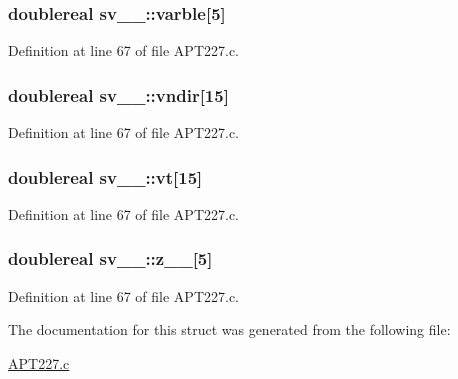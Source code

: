 \subsubsection[{\texorpdfstring{varble}{varble}}]{\setlength{\rightskip}{0pt plus 5cm}doublereal sv\+\_\+\_\+\+::varble\mbox{[}5\mbox{]}}\hypertarget{structsv__1___a0e27ecc4a7188a85bd88a9167ae356b9}{}\label{structsv__1___a0e27ecc4a7188a85bd88a9167ae356b9}


Definition at line 67 of file A\+P\+T227.\+c.

\subsubsection[{\texorpdfstring{vndir}{vndir}}]{\setlength{\rightskip}{0pt plus 5cm}doublereal sv\+\_\+\_\+\+::vndir\mbox{[}15\mbox{]}}\hypertarget{structsv__1___acfac97c5dde7f22731b288c723ee4d67}{}\label{structsv__1___acfac97c5dde7f22731b288c723ee4d67}


Definition at line 67 of file A\+P\+T227.\+c.

\subsubsection[{\texorpdfstring{vt}{vt}}]{\setlength{\rightskip}{0pt plus 5cm}doublereal sv\+\_\+\_\+\+::vt\mbox{[}15\mbox{]}}\hypertarget{structsv__1___ad053fbdb83a5306e7cc9e45a5a41ba3c}{}\label{structsv__1___ad053fbdb83a5306e7cc9e45a5a41ba3c}


Definition at line 67 of file A\+P\+T227.\+c.

\subsubsection[{\texorpdfstring{z\+\_\+\+\_\+}{z__}}]{\setlength{\rightskip}{0pt plus 5cm}doublereal sv\+\_\+\_\+\+::z\+\_\+\+\_\+\mbox{[}5\mbox{]}}\hypertarget{structsv__1___ab48c7bd13e710f0b691eb13e366d9100}{}\label{structsv__1___ab48c7bd13e710f0b691eb13e366d9100}


Definition at line 67 of file A\+P\+T227.\+c.



The documentation for this struct was generated from the following file\+:\begin{DoxyCompactItemize}
\item 
\hyperlink{APT227_8c}{A\+P\+T227.\+c}\end{DoxyCompactItemize}
